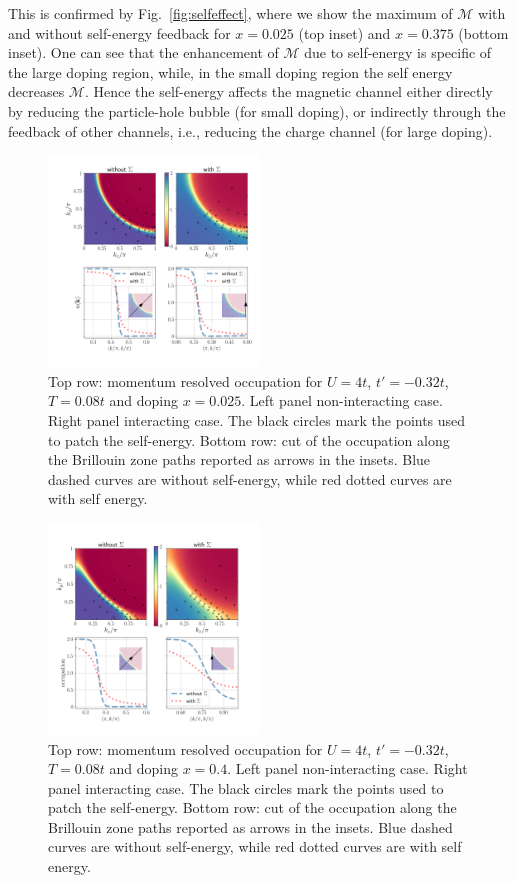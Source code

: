 This is confirmed by Fig.~\ref{fig:selfeffect}, where we show the maximum of $\mathcal{M}$ with and without self-energy feedback for $x=0.025$ (top inset) and $x=0.375$ (bottom inset).  
One can see that the enhancement of $\mathcal{M}$ due to self-energy is specific of the large doping region, while, in the small doping region the self energy decreases $\mathcal{M}$.  
Hence the self-energy affects the magnetic channel either directly by reducing the particle-hole bubble (for small doping), or indirectly through the feedback of other channels, i.e., reducing the charge channel (for large doping). 


\begin{figure}
\includegraphics[width=0.5\textwidth]{images/occupations_0975.png}
\caption{Top row: momentum resolved occupation for $U=4t$, $t'=-0.32t$, $T=0.08t$ and doping $x=0.025$. 
Left panel non-interacting case. Right panel interacting case. The black circles mark the points used to patch the self-energy.
Bottom row: cut of the occupation along the Brillouin zone paths reported as arrows in the insets. Blue dashed curves are without self-energy, while red dotted curves are with self energy. } 
\label{fig:occ975}
\end{figure}

\begin{figure}
\includegraphics[width=0.5\textwidth]{images/occupations_0600.png}
\caption{Top row: momentum resolved occupation for $U=4t$, $t'=-0.32t$, $T=0.08t$ and doping $x=0.4$. 
Left panel non-interacting case. Right panel interacting case. The black circles mark the points used to patch the self-energy.
Bottom row: cut of the occupation along the Brillouin zone paths reported as arrows in the insets. Blue dashed curves are without self-energy, while red dotted curves are with self energy. } 
\label{fig:occ600}
\end{figure}


